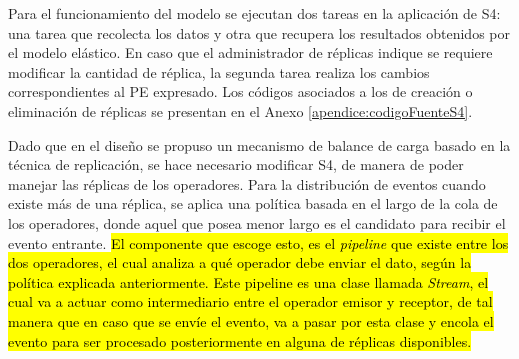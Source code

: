 %

Para el funcionamiento del modelo se ejecutan dos tareas en la aplicación de S4: una tarea que recolecta los datos y otra que recupera los resultados obtenidos por el modelo elástico. En caso que el administrador de réplicas indique se requiere modificar la cantidad de réplica, la segunda tarea realiza los cambios correspondientes al PE expresado. Los códigos asociados a los de creación o eliminación de réplicas se presentan en el Anexo \ref{apendice:codigoFuenteS4}.

Dado que en el diseño se propuso un mecanismo de balance de carga basado en la técnica de replicación, se hace necesario modificar S4, de manera de poder manejar las réplicas de los operadores. Para la distribución de eventos cuando existe más de una réplica, se aplica una política basada en el largo de la cola de los operadores, donde aquel que posea menor largo es el candidato para recibir el evento entrante. \hl{El componente que escoge esto, es el \textit{pipeline} que existe entre los dos operadores, el cual analiza a qué operador debe enviar el dato, según la política explicada anteriormente. Este pipeline es una clase llamada \textit{Stream}, el cual va a actuar como intermediario entre el operador emisor y receptor, de tal manera que en caso que se envíe el evento, va a pasar por esta clase y encola el evento para ser procesado posteriormente en alguna de réplicas disponibles.}

